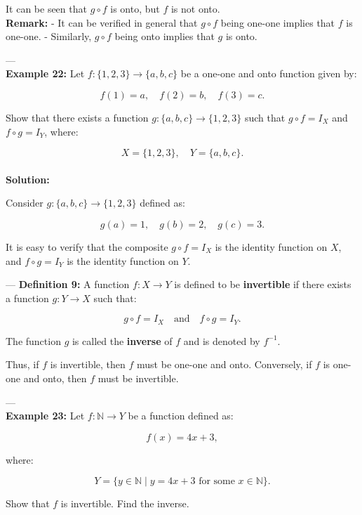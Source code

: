 \documentclass[12pt]{article}
\begin{document}
It can be seen that \( g \circ f \) is onto, but \( f \) is not onto.
\\
\textbf{Remark:}  
- It can be verified in general that \( g \circ f \) being one-one implies that \( f \) is one-one.
- Similarly, \( g \circ f \) being onto implies that \( g \) is onto.

---
\\

\textbf{Example 22:}  
Let \( f : \{1, 2, 3\} \to \{a, b, c\} \) be a one-one and onto function given by:

\[
f(1) = a, \quad f(2) = b, \quad f(3) = c.
\]

Show that there exists a function \( g: \{a, b, c\} \to \{1, 2, 3\} \) such that \( g \circ f = I_X \) and \( f \circ g = I_Y \), where:

\[
X = \{1, 2, 3\}, \quad Y = \{a, b, c\}.
\]
\\
\textbf{Solution:}  

Consider \( g: \{a, b, c\} \to \{1, 2, 3\} \) defined as:

\[
g(a) = 1, \quad g(b) = 2, \quad g(c) = 3.
\]

It is easy to verify that the composite \( g \circ f = I_X \) is the identity function on \( X \), and \( f \circ g = I_Y \) is the identity function on \( Y \).

---
\newline
\textbf{Definition 9:}  
A function \( f: X \to Y \) is defined to be \textbf{invertible} if there exists a function \( g: Y \to X \) such that:

\[
g \circ f = I_X \quad \text{and} \quad f \circ g = I_Y.
\]

The function \( g \) is called the \textbf{inverse} of \( f \) and is denoted by \( f^{-1} \).

Thus, if \( f \) is invertible, then \( f \) must be one-one and onto. Conversely, if \( f \) is one-one and onto, then \( f \) must be invertible.

---
\\

\textbf{Example 23:}  
Let \( f: \mathbb{N} \to Y \) be a function defined as:

\[
f(x) = 4x + 3,
\]

where:

\[
Y = \{y \in \mathbb{N} \mid y = 4x + 3 \text{ for some } x \in \mathbb{N} \}.
\]

Show that \( f \) is invertible. Find the inverse.\\
\end{document}
